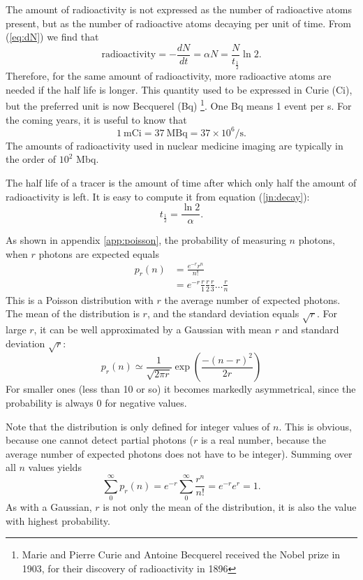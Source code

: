 \documentclass[11pt,oneside]{article}
\begin{document}
The amount of radioactivity is not expressed as the number of
radioactive atoms present, but as the number of radioactive atoms
decaying per unit of time. From (\ref{eq:dN}) we find that
\begin{equation}
  \mbox{radioactivity} = -\frac{dN}{dt} = \alpha N =
  \frac{N}{t_{\frac{1}{2}}} \ln 2.
\end{equation}
Therefore, for the same amount of radioactivity, more radioactive
atoms are needed if the half life is longer.  This quantity used to be
expressed in Curie (Ci), but the preferred unit is now Becquerel (Bq)
\footnote{Marie and Pierre Curie and Antoine Becquerel received the
Nobel prize in 1903, for their discovery of radioactivity in 1896}.
One Bq means 1 event per s. For the coming years, it is useful to know
that
\begin{equation}
 1 \ \mbox{mCi} = 37 \ \mbox{MBq} = 37 \times 10^{6} / \mbox{s}.
\end{equation}
The amounts of radioactivity used in nuclear medicine imaging are
typically in the order of $10^2$ Mbq.

The half life of a tracer is the amount of time after which only half the
amount of radioactivity is left. It is easy to compute it from equation
(\ref{jn:decay}):
\begin{equation}
 t_{\frac{1}{2}}  = \frac{\ln 2}{\alpha} .
\end{equation}

As shown in appendix \ref{app:poisson}, the probability of measuring $n$
photons, when $r$ photons are expected equals
\begin{align}
  p_r(n) &= \frac{e^{-r} r^n}{n!} \label{jn:Poisson} \\
         &= e^{-r} \frac{r}{1} \frac{r}{2} \frac{r}{3} \ldots \frac{r}{n}
\end{align}
This is a Poisson distribution with $r$ the average number of expected
photons. The mean of the distribution is $r$, and the standard
deviation equals $\sqrt{r}$. For large $r$, it can be well
approximated by a Gaussian with mean $r$ and standard deviation
$\sqrt{r}$:
\begin{equation}
  p_r(n) \simeq \frac{1}{\sqrt{2 \pi r}} \exp \left( \frac{- (n - r)^2}{2 r} 
  \right)
\end{equation} For smaller ones (less than 10 or so) it becomes markedly
asymmetrical, since the
probability is always $0$ for negative values.

Note that the distribution is only defined for integer values of $n$. This is
obvious, because one cannot detect partial photons ($r$ is a real number,
because the average number of expected photons does not have to be integer).
Summing over all $n$ values yields
\begin{equation}
 \sum_0^\infty p_r(n) = e^{-r} \sum_0^\infty \frac{r^n}{n!}
  = e^{-r} e^{r} = 1.
\end{equation}
As with a Gaussian, $r$ is not only the mean of the distribution, it is also
the value with highest probability.
\end{document}
